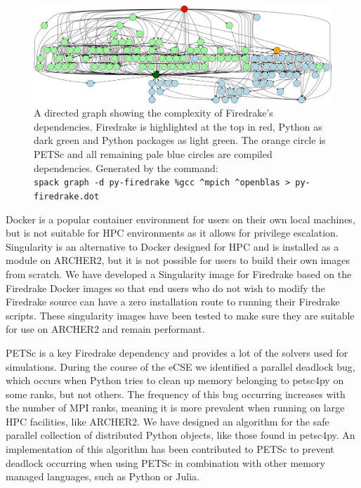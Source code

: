 \documentclass[a4paper,11pt]{article}
\begin{document}
\begin{figure}[htp]
	\centering
	\includegraphics[width=\textwidth]{firedrake_deps.png}
	\caption{A directed graph showing the complexity of Firedrake's dependencies. Firedrake is highlighted at the top in red, Python as dark green and Python packages as light green. The orange circle is PETSc and all remaining pale blue circles are compiled dependencies. Generated by the command:\\ \texttt{spack graph -d py-firedrake \%gcc \^{}mpich \^{}openblas \textgreater{} py-firedrake.dot}}
	\label{fig:fddeps}
\end{figure}

Docker is a popular container environment for users on their own local machines, but is not suitable for HPC environments as it allows for privilege escalation.
Singularity is an alternative to Docker designed for HPC and is installed as a module on ARCHER2, but it is not possible for users to build their own images from scratch.
We have developed a Singularity image for Firedrake based on the Firedrake Docker images so that end users who do not wish to modify the Firedrake source can have a zero installation route to running their Firedrake scripts.
These singularity images have been tested to make sure they are suitable for use on ARCHER2 and remain performant.

PETSc is a key Firedrake dependency and provides a lot of the solvers used for simulations.
During the course of the eCSE we identified a parallel deadlock bug, which occurs when Python tries to clean up memory belonging to petsc4py on some ranks, but not others.
The frequency of this bug occurring increases with the number of MPI ranks, meaning it is more prevalent when running on large HPC facilities, like ARCHER2.
We have designed an algorithm for the safe parallel collection of distributed Python objects, like those found in petsc4py.
An implementation of this algorithm has been contributed to PETSc to prevent deadlock occurring when using PETSc in combination with other memory managed languages, such as Python or Julia.
\end{document}
